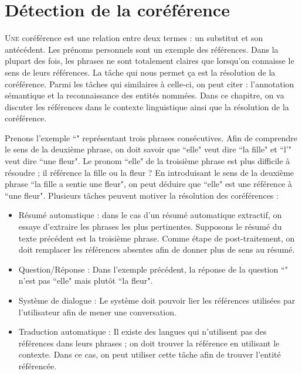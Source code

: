 \documentclass{KodeBook}
\begin{document}
		\mainmatter
	
\fi
\chapter{Détection de la coréférence}

\begin{introduction}
	\lettrine{U}{ne} coréférence est une relation entre deux termes : un substitut et son antécédent.
	Les prénoms personnels sont un exemple des références. 
	Dans la plupart des fois, les phrases ne sont totalement claires que lorsqu'on connaisse le sens de leurs références. 
	La tâche qui nous permet ça est la résolution de la coréférence. 
	Parmi les tâches qui similaires à celle-ci, on peut citer : l'annotation sémantique et la reconnaissance des entités nommées. 
	Dans ce chapitre, on va discuter les références dans le contexte linguistique ainsi que la résolution de la coréférence.
\end{introduction} 


Prenons l'exemple ``" représentant trois phrases consécutives.
Afin de comprendre le sens de la deuxième phrase, on doit savoir que ``elle" veut dire ``la fille" et ``l'" veut dire ``une fleur". 
Le pronom ``elle" de la troisième phrase est plus difficile à résoudre ; il référence la fille ou la fleur ?
En introduisant le sens de la deuxième phrase ``la fille a sentie une fleur", on peut déduire que ``elle" est une référence à ``une fleur".
Plusieurs tâches peuvent motiver la résolution des coréférences :
\begin{itemize}
	\item Résumé automatique : dans le cas d'un résumé automatique extractif, on essaye d'extraire les phrases les plus pertinentes. 
	Supposons le résumé du texte précédent est la troisième phrase.
	Comme étape de post-traitement, on doit remplacer les références absentes afin de donner plus de sens au résumé.
	\item Question/Réponse : Dans l'exemple précédent, la réponse de la question ``" n'est pas ``elle" mais plutôt ``la fleur".
	\item Système de dialogue : Le système doit pouvoir lier les références utilisées par l'utilisateur afin de mener une conversation. 
	\item Traduction automatique : Il existe des langues qui n'utilisent pas des références dans leurs phrases ; on doit trouver la référence en utilisant le contexte. 
	Dans ce cas, on peut utiliser cette tâche afin de trouver l'entité référencée.
\end{itemize}
\end{document}
